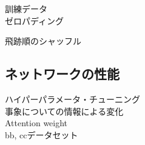 訓練データ\\
ゼロパディング

飛跡順のシャッフル

\subsection{ネットワークの性能} \label{Net:VLSTM:PerformanceofVLSTM}

ハイパーパラメータ・チューニング\\

事象についての情報による変化\\

Attention weight\\

bb, ccデータセット









